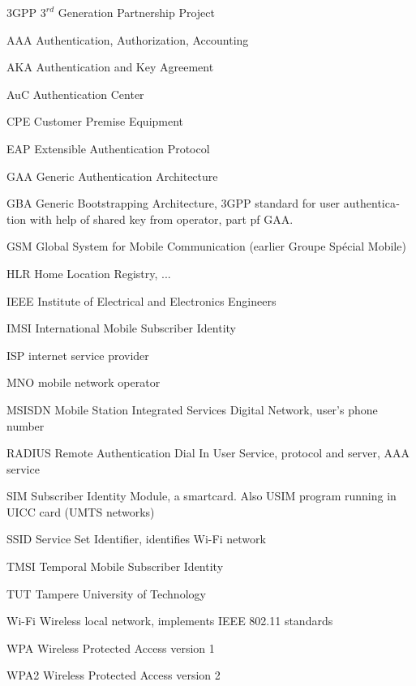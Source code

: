 \documentclass[12pt,a4paper,english]{tutthesis}
\begin{document}
\begin{otherlanguage}{english}
\begin{termlist}

\item[3GPP] $3^{rd}$ Generation Partnership Project
\item[AAA] Authentication, Authorization, Accounting
\item[AKA] Authentication and Key Agreement %
\item[AuC] Authentication Center
\item[CPE] Customer Premise Equipment %
\item[EAP] Extensible Authentication Protocol %
\item[GAA] Generic Authentication Architecture %
\item[GBA] Generic Bootstrapping Architecture, 3GPP standard for user authentication with help of shared key from operator, part pf GAA.
\item[GSM] Global System for Mobile Communication (earlier Groupe Spécial Mobile)
\item[HLR] Home Location Registry, ...
\item[IEEE] Institute of Electrical and Electronics Engineers
\item[IMSI] International Mobile Subscriber Identity
\item[ISP] internet service provider
\item[MNO] mobile network operator
\item[MSISDN] Mobile Station Integrated Services Digital Network, user's phone number
\item[RADIUS] Remote Authentication Dial In User Service, protocol and server,  AAA service 
\item[SIM]  Subscriber Identity Module, a smartcard. Also USIM program running in UICC card (UMTS networks)
\item[SSID] Service Set Identifier, identifies Wi-Fi network
\item[TMSI] Temporal Mobile Subscriber Identity
\item [TUT] Tampere University of Technology
\item[Wi-Fi] Wireless local network, implements IEEE 802.11 standards
\item[WPA] Wireless Protected Access version 1
\item[WPA2] Wireless Protected Access version 2
\end{termlist} 



\end{otherlanguage}
\end{document}
